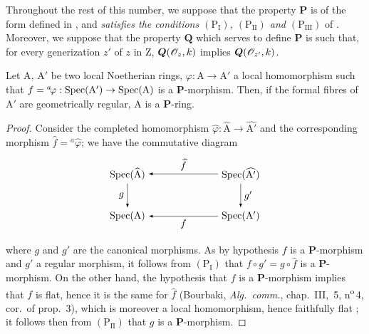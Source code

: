 \begin{env}[7.4.1]
\label{IV.7.4.1}
Throughout the rest of this number, we suppose that the property $\boldsymbol{P}$ is of the form defined in , and \emph{satisfies the conditions $(\mathrm{P_I})$, $(\mathrm{P_{II}})$ and $(\mathrm{P_{III}})$} of .
Moreover, we suppose that the property $\boldsymbol{Q}$ which serves to define $\boldsymbol{P}$ is such that, for every generization $z'$ of $z$ in $\mathrm{Z}$, $\boldsymbol{Q}(\mathscr{O}_z,k)$ implies $\boldsymbol{Q}(\mathscr{O}_{z'},k)$.
\end{env}

\begin{lemma}[7.4.2]
\label{IV.7.4.2}
Let $\mathrm{A}$, $\mathrm{A}'$ be two local Noetherian rings, $\varphi:\mathrm{A}\to\mathrm{A}'$ a local homomorphism such that $f={}^a\!\varphi:\operatorname{Spec}(\mathrm{A}')\to\operatorname{Spec}(\mathrm{A})$ is a $\boldsymbol{P}$-morphism.
Then, if the formal fibres of $\mathrm{A}'$ are geometrically regular, $\mathrm{A}$ is a $\boldsymbol{P}$-ring.
\end{lemma}


\begin{proof}
Consider the completed homomorphism $\widehat{\varphi}:\widehat{\mathrm{A}}\to\widehat{\mathrm{A}'}$ and the corresponding morphism $\widehat{f}={}^a\!\widehat{\varphi}$; we have the commutative diagram
\[
\begin{tikzpicture}[>=latex]
\node (tl) at (0,1.5) {$\Spec(\widehat{\mathrm{A}})$};
\node (tr) at (4,1.5) {$\Spec(\widehat{\mathrm{A}'})$};
\node (bl) at (0,0) {$\Spec(\mathrm{A})$};
\node (br) at (4,0) {$\Spec(\mathrm{A}')$};
\draw[->] (tr) -- node[above] {$\widehat{f}$} (tl);
\draw[->] (tl) -- node[left] {$g$} (bl);
\draw[->] (tr) -- node[right] {$g'$} (br);
\draw[->] (br) -- node[below] {$f$} (bl);
\end{tikzpicture}
\]
where $g$ and $g'$ are the canonical morphisms.
As by hypothesis $f$ is a $\boldsymbol{P}$-morphism and $g'$ a regular morphism, it follows from $(\mathrm{P_I})$ that $f\circ g'=g\circ\widehat{f}$ is a $\boldsymbol{P}$-morphism.
On the other hand, the hypothesis that $f$ is a $\boldsymbol{P}$-morphism implies that $f$ is flat, hence it is the same for $\widehat{f}$ (Bourbaki, \emph{Alg.\ comm.}, chap.~III, \textsection\,5, n\textsuperscript{o}\,4, cor.~of prop.~3), which is moreover a local homomorphism, hence faithfully flat ; it follows then from $(\mathrm{P_{II}})$ that $g$ is a $\boldsymbol{P}$-morphism.
\end{proof}

